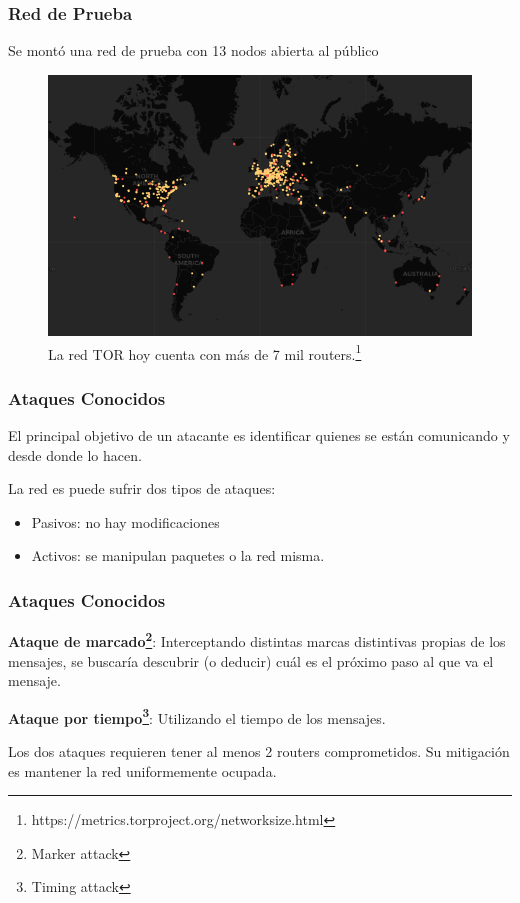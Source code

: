 \documentclass{beamer}
\newcommand{\vspc}{\vspace{0.5cm}}
\begin{document}
\begin{frame}
    \frametitle{Red de Prueba}

    Se montó una red de prueba con 13 nodos abierta al público

    \vspc

    \begin{figure}[h]
        \centering
        \includegraphics[scale=0.3]{tpo_tor.png}
        \caption{La red TOR hoy cuenta con más de 7 mil routers.\footnote{https://metrics.torproject.org/networksize.html}}
    \end{figure}

\end{frame}

\begin{frame}
    \frametitle{Ataques Conocidos}
    
    El principal objetivo de un atacante es identificar quienes se están comunicando y desde donde lo hacen.\\

    \vspc

    La red es puede sufrir dos tipos de ataques:
    \begin{itemize}
        \item Pasivos: no hay modificaciones
        \item Activos: se manipulan paquetes o la red misma.
    \end{itemize}

\end{frame}

\begin{frame}
    \frametitle{Ataques Conocidos}
    \textbf{Ataque de marcado\footnote{Marker attack}}: Interceptando distintas marcas distintivas propias de los mensajes, se buscaría descubrir (o deducir) cuál es el próximo paso al que va el mensaje.\\
    
    \vspc

    \textbf{Ataque por tiempo\footnote{Timing attack}}: Utilizando el tiempo de los mensajes.\\

    \vspc

    Los dos ataques requieren tener al menos 2 routers comprometidos. Su mitigación es mantener la red uniformemente ocupada.

\end{frame}
\end{document}
